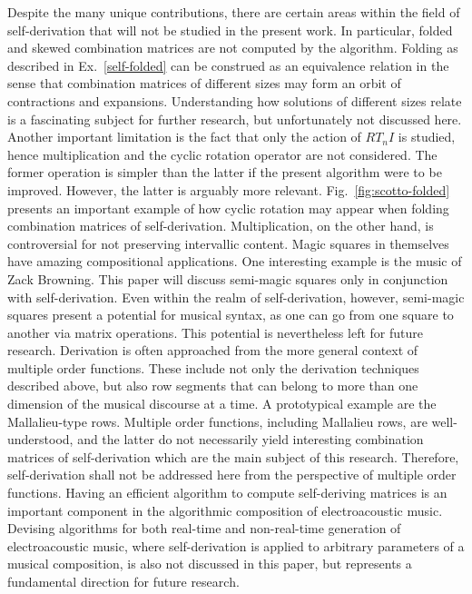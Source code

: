 Despite the many unique contributions, there are certain areas within the field of self-derivation that will not be studied in the present work. In particular, folded and skewed combination matrices are not computed by the algorithm. Folding as described in Ex.~\ref{self-folded} can be construed as an equivalence relation in the sense that combination matrices of different sizes may form an orbit of contractions and expansions. Understanding how solutions of different sizes relate is a fascinating subject for further research, but unfortunately not discussed here. Another important limitation is the fact that only the action of $RT_nI$ is studied, hence multiplication and the cyclic rotation operator are not considered. The former operation is simpler than the latter if the present algorithm were to be improved. However, the latter is arguably more relevant. Fig.~\ref{fig:scotto-folded} presents an important example of how cyclic rotation may appear when folding combination matrices of self-derivation. Multiplication, on the other hand, is controversial for not preserving intervallic content. Magic squares in themselves have amazing compositional applications. One interesting example is the music of Zack Browning. This paper will discuss semi-magic squares only in conjunction with self-derivation. Even within the realm of self-derivation, however, semi-magic squares present a potential for musical syntax, as one can go from one square to another via matrix operations. This potential is nevertheless left for future research. Derivation is often approached from the more general context of multiple order functions. These include not only the derivation techniques described above, but also row segments that can belong to more than one dimension of the musical discourse at a time. A prototypical example are the Mallalieu-type rows. Multiple order functions, including Mallalieu rows, are well-understood, and the latter do not necessarily yield interesting combination matrices of self-derivation which are the main subject of this research. Therefore, self-derivation shall not be addressed here from the perspective of multiple order functions. Having an efficient algorithm to compute self-deriving matrices is an important component in the algorithmic composition of electroacoustic music. Devising algorithms for both real-time and non-real-time generation of electroacoustic music, where self-derivation is applied to arbitrary parameters of a musical composition, is also not discussed in this paper, but represents a fundamental direction for future research.

